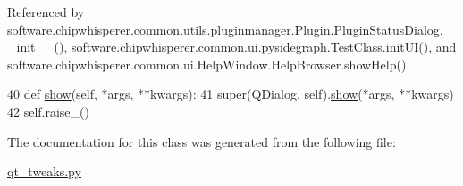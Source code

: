Referenced by software.\+chipwhisperer.\+common.\+utils.\+pluginmanager.\+Plugin.\+Plugin\+Status\+Dialog.\+\_\+\+\_\+init\+\_\+\+\_\+(), software.\+chipwhisperer.\+common.\+ui.\+pysidegraph.\+Test\+Class.\+init\+U\+I(), and software.\+chipwhisperer.\+common.\+ui.\+Help\+Window.\+Help\+Browser.\+show\+Help().


\begin{DoxyCode}
40     \textcolor{keyword}{def }\hyperlink{classsoftware_1_1chipwhisperer_1_1common_1_1utils_1_1qt__tweaks_1_1QDialog_a40d5fa80be8258e90cf4a700c4000b96}{show}(self, *args, **kwargs):
41         super(QDialog, self).\hyperlink{classsoftware_1_1chipwhisperer_1_1common_1_1utils_1_1qt__tweaks_1_1QDialog_a40d5fa80be8258e90cf4a700c4000b96}{show}(*args, **kwargs)
42         self.raise\_()\end{DoxyCode}


The documentation for this class was generated from the following file\+:\begin{DoxyCompactItemize}
\item 
\hyperlink{qt__tweaks_8py}{qt\+\_\+tweaks.\+py}\end{DoxyCompactItemize}
